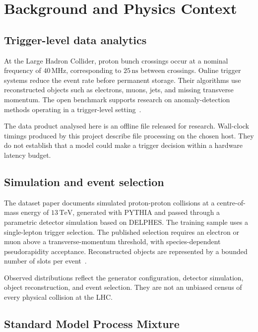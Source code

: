 \documentclass[11pt,a4paper]{article}
\begin{document}
\section{Background and Physics Context}

\subsection{Trigger-level data analytics}

At the Large Hadron Collider, proton bunch crossings occur at a nominal frequency of \(40\,\mathrm{MHz}\), corresponding to \(25\,\mathrm{ns}\) between crossings. Online trigger systems reduce the event rate before permanent storage. Their algorithms use reconstructed objects such as electrons, muons, jets, and missing transverse momentum. The open benchmark supports research on anomaly-detection methods operating in a trigger-level setting~\cite{govorkova2022lhc,zenodo5046428,adc2021}.

The data product analysed here is an offline file released for research. Wall-clock timings produced by this project describe file processing on the chosen host. They do not establish that a model could make a trigger decision within a hardware latency budget.

\subsection{Simulation and event selection}

The dataset paper documents simulated proton-proton collisions at a centre-of-mass energy of \(13\,\mathrm{TeV}\), generated with PYTHIA and passed through a parametric detector simulation based on DELPHES. The training sample uses a single-lepton trigger selection. The published selection requires an electron or muon above a transverse-momentum threshold, with species-dependent pseudorapidity acceptance. Reconstructed objects are represented by a bounded number of slots per event~\cite{govorkova2022lhc}.

Observed distributions reflect the generator configuration, detector simulation, object reconstruction, and event selection. They are not an unbiased census of every physical collision at the LHC.

\subsection{Standard Model Process Mixture}
\end{document}
